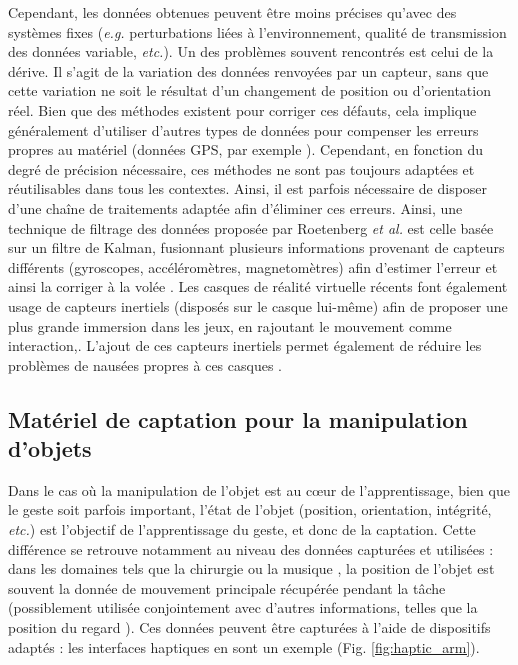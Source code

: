 Cependant, les données obtenues peuvent être moins précises qu'avec des systèmes fixes (\textit{e.g.} perturbations liées à l'environnement, qualité de transmission des données variable, \textit{etc.}). Un des problèmes souvent rencontrés est celui de la dérive. Il s'agit de la variation des données renvoyées par un capteur, sans que cette variation ne soit le résultat d'un changement de position ou d'orientation réel. Bien que des méthodes existent pour corriger ces défauts, cela implique généralement d'utiliser d'autres types de données pour compenser les erreurs propres au matériel (données GPS, par exemple \parencite{Bevly2004Gps}). Cependant, en fonction du degré de précision nécessaire, ces méthodes ne sont pas toujours adaptées et réutilisables dans tous les contextes. Ainsi, il est parfois nécessaire de disposer d'une chaîne de traitements adaptée afin d'éliminer ces erreurs. Ainsi, une technique de filtrage des données proposée par Roetenberg \textit{et al.} est celle basée sur un filtre de Kalman, fusionnant plusieurs informations provenant de capteurs différents (gyroscopes, accéléromètres, magnetomètres) afin d'estimer l'erreur et ainsi la corriger à la volée  \parencite{Roetenberg2005Com}. Les casques de réalité virtuelle récents font également usage de capteurs inertiels (disposés sur le casque lui-même) afin de proposer une plus grande immersion dans les jeux, en rajoutant le mouvement comme interaction,. L'ajout de ces capteurs inertiels permet également de réduire les problèmes de nausées propres à ces casques \parencite{HTCViveSpecs}.

\subsection{Matériel de captation pour la manipulation d'objets}
Dans le cas où la manipulation de l'objet est au cœur de l'apprentissage, bien que le geste soit parfois important, l'état de l'objet (position, orientation, intégrité, \textit{etc.}) est l'objectif de l'apprentissage du geste, et donc de la captation. Cette différence se retrouve notamment au niveau des données capturées et utilisées : dans les domaines tels que la chirurgie \parencite{BMT_2015} \parencite{Choi2015103} ou la musique \parencite{Ng2008}, la position de l'objet est souvent la donnée de mouvement principale récupérée pendant la tâche (possiblement utilisée conjointement avec d'autres informations, telles que la position du regard \parencite{BMT_2015}). Ces données peuvent être capturées à l'aide de dispositifs adaptés : les interfaces haptiques en sont un exemple (Fig. \ref{fig:haptic_arm}).


